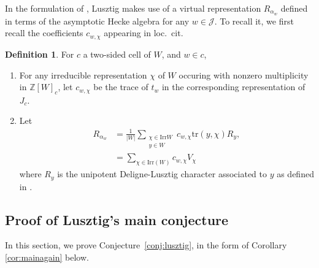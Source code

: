 \documentclass{amsart}
\theoremstyle{definition}
\newtheorem{defn}[thm]{Definition}
\begin{document}
In the formulation of \cite[Conjecture 2.3]{L}, Lusztig makes use of a virtual representation $R_{\alpha_w}$ defined in terms of the asymptotic Hecke algebra for any $w \in \mathcal{J}$. To recall it, we first recall the coefficients $c_{w, \chi}$ appearing in loc.\ cit.

\begin{defn}\label{def:raw}
For $c$ a two-sided cell of $W$, and $w \in c$,
\begin{enumerate}
    \item For any irreducible representation $\chi$ of $W$ occuring with nonzero multiplicity in $\mathbb{Z}[W]_c$, let $c_{w,\chi}$ be the trace of $t_w$ in the corresponding representation of $J_c$. 
    \item Let
    \begin{align*}
        R_{\alpha_w} & = \frac{1}{|W|} \sum_{\substack{\chi\in \mathrm{Irr}{W}\\ y \in W}} c_{w,\chi}\mathrm{tr}(y, \chi) R_y,\\
        & = \sum_{\chi \in \mathrm{Irr}(W)} c_{w,\chi} V_{\chi}
    \end{align*}
    where $R_y$ is the unipotent Deligne-Lusztig character associated to $y$ as defined in \cite[Section 1.5]{DL}.
\end{enumerate}
\end{defn}

\subsection{Proof of Lusztig's main conjecture}
In this section, we prove Conjecture~\ref{conj:lusztig}, in the form of Corollary \ref{cor:mainagain} below. 
\end{document}
